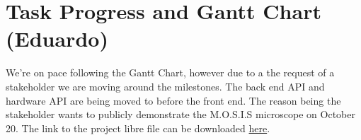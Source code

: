 \section{Task Progress and Gantt Chart (Eduardo)}
We're on pace following the Gantt Chart, however due to a the request of a stakeholder we are moving around the milestones. The back end API and hardware API are being moved to before the front end. The reason being the stakeholder wants to publicly demonstrate the M.O.S.I.S microscope on October 20.
The link to the project libre file can be downloaded \href{https://github.com/fabiomatos999/M.O.S.I.S/blob/capstone/Proposal%20Report/Project%20Schedule/M.O.S.I.S%20UI%202.0%20Schedule.pod}{here}.


